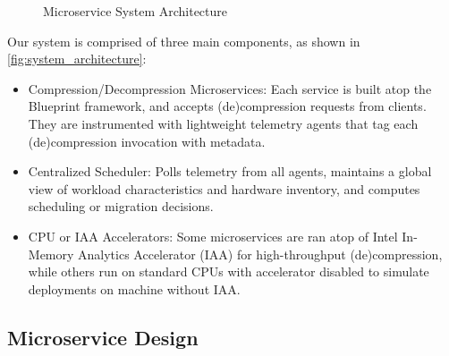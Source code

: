 \begin{figure}[ht]
  \centering
  \caption{Microservice System Architecture}
  \label{fig:system_architecture}
\end{figure}

Our system is comprised of three main components, as shown in \autoref{fig:system_architecture}:

\begin{itemize}
    \item Compression/Decompression Microservices: Each service is built atop the Blueprint framework, and accepts (de)compression requests from clients. They are instrumented with lightweight telemetry agents that tag each (de)compression invocation with metadata.
    \item Centralized Scheduler: Polls telemetry from all agents, maintains a global view of workload characteristics and hardware inventory, and computes scheduling or migration decisions.
    \item CPU or IAA Accelerators: Some microservices are ran atop of Intel In-Memory Analytics Accelerator (IAA) for high-throughput (de)compression, while others run on standard CPUs with accelerator disabled to simulate deployments on machine without IAA.
\end{itemize}

\subsection{Microservice Design}

